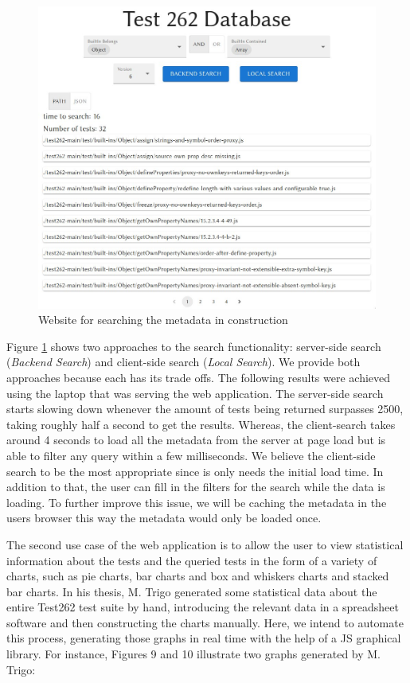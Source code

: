 \documentclass[runningheads]{llncs}
\begin{document}
\begin{figure}[ht]
    \centering
    \includegraphics[width=1\textwidth]{images/website.png}
    \caption{Website for searching the metadata in construction}
    \label{fig:website}
\end{figure}


Figure \ref{fig:website} shows two approaches to the search functionality: server-side search (\emph{Backend Search}) and client-side search (\emph{Local Search}). We provide both approaches because each has its trade offs. The following results were achieved using the laptop that was serving the web application. The server-side search starts slowing down whenever the amount of tests being returned surpasses 2500, taking roughly half a second to get the results. Whereas, the client-search takes around 4 seconds to load all the metadata from the server at page load but is able to filter any query within a few milliseconds. We believe the client-side search to be the most appropriate since is only needs the initial load time. In addition to that, the user can fill in the filters for the search while the data is loading. To further improve this issue, we will be caching the metadata in the users browser this way the metadata would only be loaded once.

The second use case of the web application is to allow the user to view statistical information about the tests and the queried tests in the form of a variety of charts, such as pie charts, bar charts and box and whiskers charts and stacked bar charts. In his thesis, M. Trigo generated some statistical data about the entire Test262 test suite by hand, introducing the relevant data in a spreadsheet software and then constructing the charts manually. Here, we intend to automate this process, generating those graphs in real time with the help of a JS graphical library. For instance, Figures 9 and 10 illustrate two graphs generated by M. Trigo:
\end{document}

